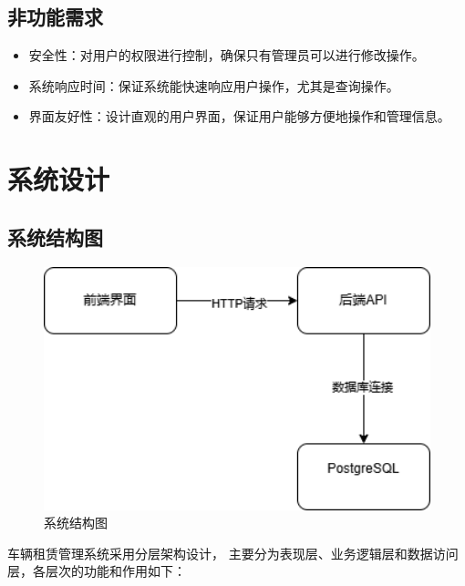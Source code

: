 \documentclass[UTF8,a4paper,12pt]{ctexart}
\begin{document}
\subsection{非功能需求}

\begin{itemize}
    \item 安全性：对用户的权限进行控制，确保只有管理员可以进行修改操作。
    \item 系统响应时间：保证系统能快速响应用户操作，尤其是查询操作。
    \item 界面友好性：设计直观的用户界面，保证用户能够方便地操作和管理信息。
\end{itemize}

\section{系统设计}

\subsection{系统结构图}

\begin{figure}[htbp]  %
    \centering  %
    \includegraphics[width=1\textwidth]{pic/sap.png}  %
    \caption{系统结构图}  %
    \label{fig:sap}  %
\end{figure}

车辆租赁管理系统采用分层架构设计，
主要分为表现层、业务逻辑层和数据访问层，各层次的功能和作用如下：
\end{document}
